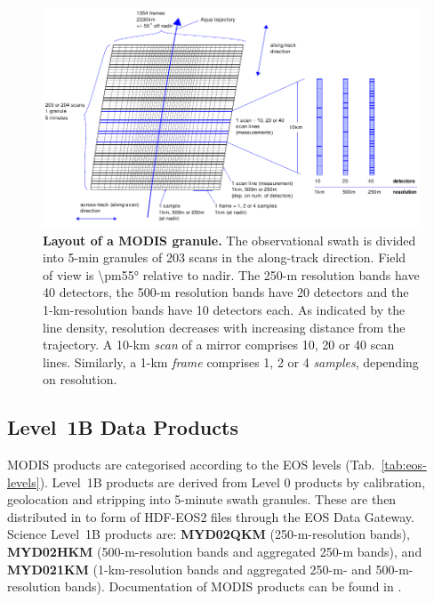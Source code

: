 \begin{figure}[t]
\includegraphics[width=400pt]{images/modis-swath.pdf}
\caption[Layout of a MODIS granule]{\textbf{Layout of a MODIS granule.} The observational swath is divided
into 5-min granules of 203 scans in the along-track direction. Field of view is
\ang{\pm55}
relative to nadir. The 250-m resolution bands have 40 detectors, the 500-m
resolution bands have 20 detectors and the 1-km-resolution bands have 10
detectors each. As indicated by the line density, resolution
decreases
with increasing distance from the trajectory.
A 10-km \textit{scan} of a mirror
comprises 10, 20 or 40 scan lines. Similarly, a 1-km \textit{frame} comprises 1,
2 or 4 \textit{samples}, depending on resolution.}
\label{fig:modis-swath}
\end{figure}

\subsection{Level~1B Data Products}\label{sec:modis-level1b-data-products}
MODIS products are categorised according to the EOS levels
(Tab.~\ref{tab:eos-levels}). Level~1B products are derived from Level 0 products
by calibration, geolocation and stripping into 5-minute swath granules.
These are then distributed in to form of HDF-EOS2 files through the EOS Data
Gateway.
Science Level~1B products are: \textbf{MYD02QKM} (250-m-resolution bands),
\textbf{MYD02HKM} (500-m-resolution bands and aggregated 250-m bands), and
\textbf{MYD021KM} (1-km-resolution bands and aggregated 250-m- and
500-m-resolution
bands). Documentation of MODIS products can be found
in \cite{MODIS_Level1B_ProductUsersGuide2009}.

